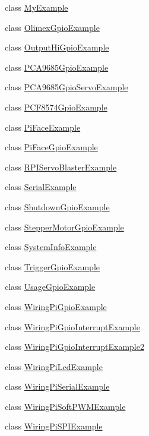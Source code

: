 \begin{DoxyCompactItemize}
class \hyperlink{classcom_1_1pi4j_1_1examples_1_1MyExample}{My\+Example}
\item 
class \hyperlink{classcom_1_1pi4j_1_1examples_1_1OlimexGpioExample}{Olimex\+Gpio\+Example}
\item 
class \hyperlink{classcom_1_1pi4j_1_1examples_1_1OutputHiGpioExample}{Output\+Hi\+Gpio\+Example}
\item 
class \hyperlink{classcom_1_1pi4j_1_1examples_1_1PCA9685GpioExample}{P\+C\+A9685\+Gpio\+Example}
\item 
class \hyperlink{classcom_1_1pi4j_1_1examples_1_1PCA9685GpioServoExample}{P\+C\+A9685\+Gpio\+Servo\+Example}
\item 
class \hyperlink{classcom_1_1pi4j_1_1examples_1_1PCF8574GpioExample}{P\+C\+F8574\+Gpio\+Example}
\item 
class \hyperlink{classcom_1_1pi4j_1_1examples_1_1PiFaceExample}{Pi\+Face\+Example}
\item 
class \hyperlink{classcom_1_1pi4j_1_1examples_1_1PiFaceGpioExample}{Pi\+Face\+Gpio\+Example}
\item 
class \hyperlink{classcom_1_1pi4j_1_1examples_1_1RPIServoBlasterExample}{R\+P\+I\+Servo\+Blaster\+Example}
\item 
class \hyperlink{classcom_1_1pi4j_1_1examples_1_1SerialExample}{Serial\+Example}
\item 
class \hyperlink{classcom_1_1pi4j_1_1examples_1_1ShutdownGpioExample}{Shutdown\+Gpio\+Example}
\item 
class \hyperlink{classcom_1_1pi4j_1_1examples_1_1StepperMotorGpioExample}{Stepper\+Motor\+Gpio\+Example}
\item 
class \hyperlink{classcom_1_1pi4j_1_1examples_1_1SystemInfoExample}{System\+Info\+Example}
\item 
class \hyperlink{classcom_1_1pi4j_1_1examples_1_1TriggerGpioExample}{Trigger\+Gpio\+Example}
\item 
class \hyperlink{classcom_1_1pi4j_1_1examples_1_1UsageGpioExample}{Usage\+Gpio\+Example}
\item 
class \hyperlink{classcom_1_1pi4j_1_1examples_1_1WiringPiGpioExample}{Wiring\+Pi\+Gpio\+Example}
\item 
class \hyperlink{classcom_1_1pi4j_1_1examples_1_1WiringPiGpioInterruptExample}{Wiring\+Pi\+Gpio\+Interrupt\+Example}
\item 
class \hyperlink{classcom_1_1pi4j_1_1examples_1_1WiringPiGpioInterruptExample2}{Wiring\+Pi\+Gpio\+Interrupt\+Example2}
\item 
class \hyperlink{classcom_1_1pi4j_1_1examples_1_1WiringPiLcdExample}{Wiring\+Pi\+Lcd\+Example}
\item 
class \hyperlink{classcom_1_1pi4j_1_1examples_1_1WiringPiSerialExample}{Wiring\+Pi\+Serial\+Example}
\item 
class \hyperlink{classcom_1_1pi4j_1_1examples_1_1WiringPiSoftPWMExample}{Wiring\+Pi\+Soft\+P\+W\+M\+Example}
\item 
class \hyperlink{classcom_1_1pi4j_1_1examples_1_1WiringPiSPIExample}{Wiring\+Pi\+S\+P\+I\+Example}
\end{DoxyCompactItemize}
